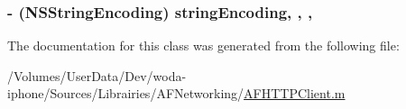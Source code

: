 \hypertarget{interface_a_f_h_t_t_p_body_part_a842a1899ac06a5ca474a00d1c7a7d7fd}{
\subsubsection[{string\-Encoding}]{\setlength{\rightskip}{0pt plus 5cm}-\/ (N\-S\-String\-Encoding) string\-Encoding\hspace{0.3cm}{\ttfamily [read]}, {\ttfamily [write]}, {\ttfamily [nonatomic]}, {\ttfamily [assign]}}}\label{interface_a_f_h_t_t_p_body_part_a842a1899ac06a5ca474a00d1c7a7d7fd}


The documentation for this class was generated from the following file\-:\begin{DoxyCompactItemize}
\item 
/\-Volumes/\-User\-Data/\-Dev/woda-\/iphone/\-Sources/\-Librairies/\-A\-F\-Networking/\hyperlink{_a_f_h_t_t_p_client_8m}{A\-F\-H\-T\-T\-P\-Client.\-m}\end{DoxyCompactItemize}
